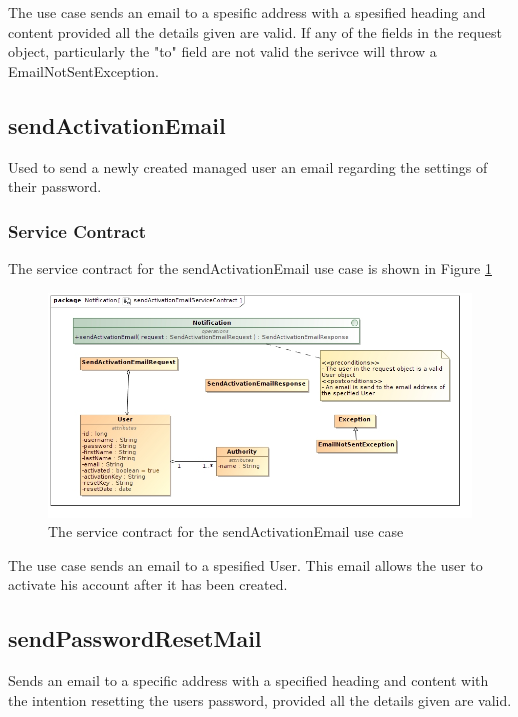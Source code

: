 The use case sends an email to a spesific address with a spesified heading and content
provided all the details given are valid. If any of the fields in the request object,
particularly the "to" field are not valid the serivce will throw a EmailNotSentException.

\subsection{sendActivationEmail}
Used to send a newly created managed user an email regarding the settings of
their password.

\subsubsection{Service Contract}
The service contract for the sendActivationEmail use case is shown in Figure \ref{sendActivationEmailServiceContract}
\begin{figure}[H]
	\begin{center}
		\includegraphics[scale=0.5]{../Diagrams and Charts/Notifications/sendActivationEmailServiceContract.jpg}
		\caption{The service contract for the sendActivationEmail use case}
	\end{center}
	\label{sendActivationEmailServiceContract}
\end{figure}

The use case sends an email to a spesified User. This email allows the user to
activate his account after it has been created.

\subsection{sendPasswordResetMail}
Sends an email to a specific address with a specified heading and content
with the intention resetting the users password, provided all the details 
given are valid.

